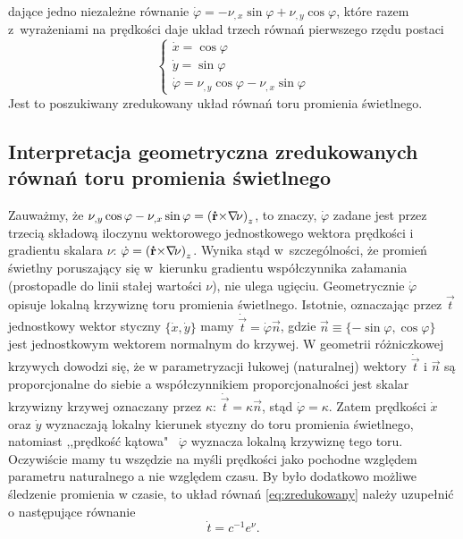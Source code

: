 dające jedno niezależne równanie $\dot{\varphi}=-\nu_{,x}\sin{\varphi}+\nu_{,y}\cos{\varphi}$, które razem z~wyrażeniami na prędkości daje układ trzech równań pierwszego rzędu postaci
%
%
\begin{equation}\label{eq:zredukowany}
\left\{\begin{array}{l}
  \dot{x}=\cos{\varphi} \\ 
  \dot{y}=\sin{\varphi} \\
  \dot{\varphi}=\nu_{,y}\cos{\varphi}-\nu_{,x}\sin{\varphi}
\end{array}\right.
\end{equation}
Jest to poszukiwany zredukowany układ równań toru promienia świetlnego.

\subsection{Interpretacja geometryczna zredukowanych równań toru promienia świetlnego}
\indent Zauważmy, że $\nu_{,y}\cos{\varphi}-\nu_{,x}\sin{\varphi}=\left({{\bf \dot{{\bf r}}}{\times}{\bf {\bf \nabla}{\!\nu}}}\right)_z$, to znaczy, $\dot{\varphi}$ zadane jest przez trzecią składową iloczynu wektorowego 
jednostkowego wektora prędkości i gradientu skalara $\nu$: $\dot{\varphi}=\left({{\bf \dot{{\bf r}}}{\times}{\bf {\bf \nabla}{\!\nu}}}\right)_z$. Wynika stąd w~szczególności, że promień świetlny poruszający się w~kierunku gradientu współczynnika załamania (prostopadle do linii stałej wartości $\nu$), nie ulega ugięciu. Geometrycznie $\dot{\varphi}$ opisuje lokalną krzywiznę toru promienia świetlnego. Istotnie, oznaczając przez $\vec{t}$ jednostkowy wektor styczny
$\{\dot{x},\dot{y}\}$ mamy $\dot{\vec{t}}=\dot{\varphi}\vec{n}$, gdzie $\vec{n}\equiv\{-\sin{\varphi},\cos{\varphi}\}$ jest jednostkowym wektorem normalnym do krzywej. W geometrii różniczkowej krzywych dowodzi się, że w parametryzacji łukowej (naturalnej) wektory $\dot{\vec{t}}$ i $\vec{n}$ są proporcjonalne do siebie a współczynnikiem proporcjonalności jest skalar krzywizny krzywej oznaczany przez $\kappa$:  $\dot{\vec{t}}=\kappa \vec{n}$, stąd $\dot{\varphi}=\kappa$. Zatem prędkości $\dot{x}$ oraz $\dot{y}$ wyznaczają lokalny kierunek styczny do toru promienia świetlnego, natomiast ,,prędkość kątowa"  \, $\dot{\varphi}$ wyznacza lokalną krzywiznę tego toru. Oczywiście mamy tu wszędzie na myśli prędkości jako pochodne względem parametru naturalnego a nie względem czasu. By było dodatkowo możliwe śledzenie promienia w czasie, to układ równań  \eqref{eq:zredukowany} należy uzupełnić o następujące równanie
$$\dot{t}=c^{-1}e^{\nu}.$$